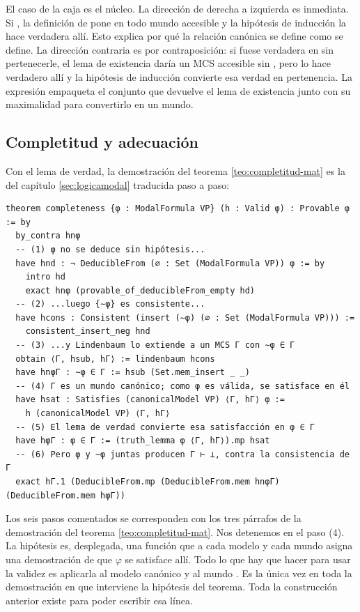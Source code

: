 El caso de la caja es el núcleo. La dirección de derecha a izquierda es inmediata. Si , la definición de  pone  en todo mundo accesible y la hipótesis de inducción la hace verdadera allí. Esto explica por qué la relación canónica se define como se define. La dirección contraria es por contraposición: si  fuese verdadera en  sin pertenecerle, el lema de existencia daría un MCS accesible sin , pero  lo hace verdadero allí y la hipótesis de inducción convierte esa verdad en pertenencia. La expresión  empaqueta el conjunto que devuelve el lema de existencia junto con su maximalidad para convertirlo en un mundo.

\subsection{Completitud y adecuación}\label{subsec:comp-fin}

Con el lema de verdad, la demostración del teorema \ref{teo:completitud-mat} es la del capítulo \ref{sec:logicamodal} traducida paso a paso:

\begin{lstlisting}
theorem completeness {φ : ModalFormula VP} (h : Valid φ) : Provable φ := by
  by_contra hnφ
  -- (1) φ no se deduce sin hipótesis...
  have hnd : ¬ DeducibleFrom (∅ : Set (ModalFormula VP)) φ := by
    intro hd
    exact hnφ (provable_of_deducibleFrom_empty hd)
  -- (2) ...luego {∼φ} es consistente...
  have hcons : Consistent (insert (∼φ) (∅ : Set (ModalFormula VP))) :=
    consistent_insert_neg hnd
  -- (3) ...y Lindenbaum lo extiende a un MCS Γ con ∼φ ∈ Γ
  obtain ⟨Γ, hsub, hΓ⟩ := lindenbaum hcons
  have hnφΓ : ∼φ ∈ Γ := hsub (Set.mem_insert _ _)
  -- (4) Γ es un mundo canónico; como φ es válida, se satisface en él
  have hsat : Satisfies (canonicalModel VP) ⟨Γ, hΓ⟩ φ :=
    h (canonicalModel VP) ⟨Γ, hΓ⟩
  -- (5) El lema de verdad convierte esa satisfacción en φ ∈ Γ
  have hφΓ : φ ∈ Γ := (truth_lemma φ ⟨Γ, hΓ⟩).mp hsat
  -- (6) Pero φ y ∼φ juntas producen Γ ⊢ ⊥, contra la consistencia de Γ
  exact hΓ.1 (DeducibleFrom.mp (DeducibleFrom.mem hnφΓ) (DeducibleFrom.mem hφΓ))
\end{lstlisting}

Los seis pasos comentados se corresponden con los tres párrafos de la demostración del teorema \ref{teo:completitud-mat}. Nos detenemos en el paso (4). La hipótesis  es, desplegada, una función que a cada modelo y cada mundo asigna una demostración de que $\varphi$ se satisface allí. Todo lo que hay que hacer para usar la validez es aplicarla al modelo canónico y al mundo . Es la única vez en toda la demostración en que interviene la hipótesis del teorema. Toda la construcción anterior existe para poder escribir esa línea.


